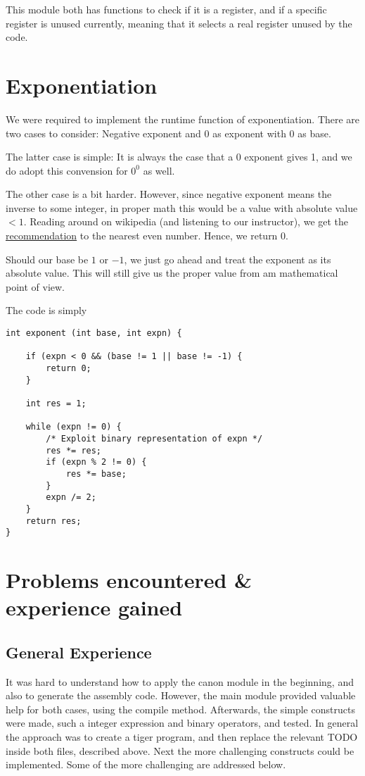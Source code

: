 \documentclass{article}
\begin{document}
This module both has functions to check if it is a register, and if a specific register is unused currently, meaning that it selects a real register unused by the code.

\section{Exponentiation}
We were required to implement the runtime function of exponentiation. There are two cases to consider: Negative exponent and 0 as exponent with 0 as base.

The latter case is simple: It is always the case that a 0 exponent gives 1, and we do adopt this convension for $0^0$ as well.

The other case is a bit harder. However, since negative exponent means the inverse to some integer, in proper math this would be a value with absolute value $ < 1$. Reading around on wikipedia (and listening to our instructor), we get the \href{https://en.wikipedia.org/wiki/IEEE_floating_point}{recommendation} to the nearest even number. Hence, we return 0.

Should our base be $1$ or $-1$, we just go ahead and treat the exponent as its absolute value. This will still give us the proper value from am mathematical point of view.

The code is simply
\begin{verbatim}
int exponent (int base, int expn) {

    if (expn < 0 && (base != 1 || base != -1) {
        return 0;
    }

    int res = 1;

    while (expn != 0) {
        /* Exploit binary representation of expn */
        res *= res;
        if (expn % 2 != 0) {
            res *= base;
        }
        expn /= 2;
    }
    return res;
}
\end{verbatim}
\section{Problems encountered \& experience gained}

\subsection{General Experience}
It was hard to understand how to apply the canon module in the beginning, and also to generate the assembly code. However, the main module provided valuable help for both cases, using the compile method. Afterwards, the simple constructs were made, such a integer expression and binary operators, and tested. In general the approach was to create a tiger program, and then replace the relevant TODO inside both files, described above.
Next the more challenging constructs could be implemented. Some of the more challenging are addressed below.  
\end{document}
